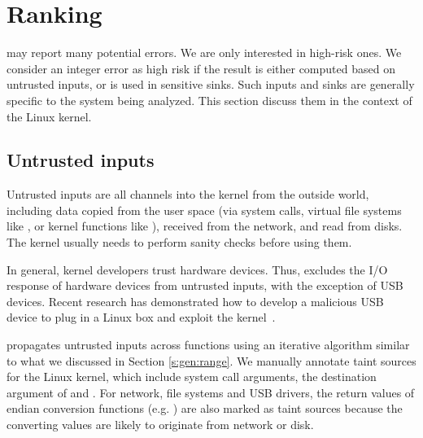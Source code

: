 \section{Ranking}
\label{s:rank}

\sys may report many potential errors.  We are only interested
in high-risk ones.  We consider an integer error as high risk if the
result is either computed based on untrusted inputs, or is used in
sensitive sinks.  Such inputs and sinks are generally specific to
the system being analyzed.  This section discuss them in the context
of the Linux kernel.

\subsection{Untrusted inputs}
\label{s:rank:input}

Untrusted inputs are all channels into the kernel from the outside world,
including data copied from the user space (via system calls, virtual file
systems like , or kernel functions like ),
received from the network, and read from disks. The kernel usually needs to
perform sanity checks before using them. 

In general, kernel developers trust hardware devices. Thus, \sys
excludes the I/O response of hardware devices from untrusted inputs,
with the exception of USB devices.  Recent research has demonstrated
how to develop a malicious USB device to plug in a Linux box and
exploit the kernel~\cite{usb:buffer-overflow}.

\sys propagates untrusted inputs across functions using an iterative algorithm
similar to what we discussed in Section \ref{s:gen:range}. We manually annotate
taint sources for the Linux kernel, which include system call arguments, the
destination argument of  and . For network,
file systems and USB drivers, the return values of endian conversion functions
(e.g. ) are also marked as taint sources because the
converting values are likely to originate from network or disk.




